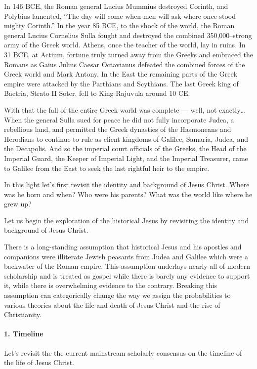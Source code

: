 In 146 BCE, the Roman general Lucius Mummius destroyed Corinth, and Polybius lamented, ``The day will come when men will ask where once stood mighty Corinth.''
In the year 85 BCE, to the shock of the world, the Roman general Lucius Cornelius Sulla fought and destroyed the combined 350,000–strong army of the Greek world.
Athens, once the teacher of the world, lay in ruins.
In 31 BCE, at Actium, fortune truly turned away from the Greeks and embraced the Romans as Gaius Julius Caesar Octavianus defeated the combined forces of the Greek world and Mark Antony.
In the East the remaining parts of the Greek empire were attacked by the Parthians and Scythians.
The last Greek king of Bactria, Strato II Soter, fell to King Rajuvula around 10 CE.

With that the fall of the entire Greek world was complete — well, not exactly\ldots{}
When the general Sulla sued for peace he did not fully incorporate Judea, a rebellious land, and permitted the Greek dynasties of the Hasmoneans and Herodians to continue to rule as client kingdoms of Galilee, Samaria, Judea, and the Decapolis.
And so the imperial court officials of the Greeks, the Head of the Imperial Guard, the Keeper of Imperial Light, and the Imperial Treasurer, came to Galilee from the East to seek the last rightful heir to the empire.

In this light let's first revisit the identity and background of Jesus Christ.
Where was he born and when?
Who were his parents?
What was the world like where he grew up?

Let us begin the exploration of the historical Jesus by revisiting the identity and background of Jesus Christ.

There is a long-standing assumption that historical Jesus and his apostles and companions were illiterate Jewish peasants from Judea and Galilee which were a backwater of the Roman empire.
This assumption underlays nearly all of modern scholarship and is treated as gospel while there is barely any evidence to support it, while there is overwhelming evidence to the contrary.
Breaking this assumption can categorically change the way we assign the probabilities to various theories about the life and death of Jesus Christ and the rise of Christianity.

\paragraph{1.
Timeline}\label{par:historical-background}

Let's revisit the the current mainstream scholarly consensus on the timeline of the life of Jesus Christ.

